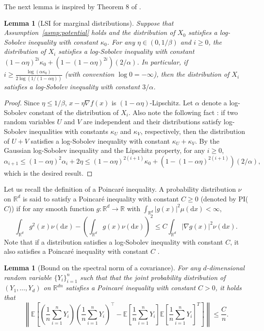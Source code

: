 \documentclass[12pt,reqno]{amsart}
\newtheorem{lemma}[theorem]{Lemma}
\theoremstyle{remark}
\theoremstyle{definition}
\newcommand{\R}{\mathbb{R}}
\newcommand{\E}{\mathbb{E}}
\newcommand{\diff}{\mathrm{d}}
\begin{document}
The next lemma is inspired by Theorem 8 of \citet[arXiv v4]{vempala2019rapid}.
\begin{lemma}[LSI for marginal distributions]\label{lem:vem19}
    Suppose that Assumption~\ref{asmp:potential} holds and the distribution of $X_{0}$ satisfies a log-Sobolev inequality with constant $\kappa_{0}$. For any $\eta\in(0,1/\beta)$ and $i\ge 0$, the distribution of $X_{i}$ satisfies a log-Sobolev inequality with constant $(1-\alpha\eta)^{2i}\kappa_{0}+(1-(1-\alpha\eta)^{2i})(2/\alpha)$.
    In particular, if $i\ge \frac{\log(\alpha\kappa_{0})}{2\log(1/(1-\alpha\eta))}$ (with convention $\log0=-\infty$), then the distribution of $X_{i}$ satisfies a log-Sobolev inequality with constant $3/\alpha$.
\end{lemma}

\begin{proof}
    Since $\eta\le 1/\beta$, $x-\eta\nabla f(x)$ is $(1-\alpha\eta)$-Lipschitz.
    Let $\alpha$ denote a log-Sobolev constant of the distribution of $X_{i}$.
    Also note the following fact \citep{bakry2014analysis}: if two random variables $U$ and $V$ are independent and their distributions satisfy log-Sobolev inequalities with constants $\kappa_{U}$ and $\kappa_{V}$, respectively, then the distribution of $U+V$ satisfies a log-Sobolev inequality with constant $\kappa_{U}+\kappa_{V}$.
    By the Gaussian log-Sobolev inequality and the Lipschitz property, for any $i\ge0$,
    \begin{equation*}
        \alpha_{i+1}\le (1-\alpha\eta)^{2}\alpha_{i}+2\eta\le (1-\alpha\eta)^{2(i+1)}\kappa_{0}+(1-(1-\alpha\eta)^{2(i+1)})(2/\alpha),
    \end{equation*}
    which is the desired result.
\end{proof}

Let us recall the definition of a Poincar\'{e} inequality. 
A probability distribution $\nu$ on $\R^{d}$ is said to satisfy a Poincar\'{e} inequality with constant $C\ge 0$ (denoted by PI($C$)) if for any smooth function $g:\R^{d}\to\R$ with $\int_{\R^{d}}|g(x)|^{2}\mu(\diff x)<\infty$,
\begin{equation*}
    \int_{\R^{d}}g^{2}(x)\nu(\diff x)-\left(\int_{\R^{d}}g(x)\nu(\diff x)\right)^{2}\le C\int_{\R^{d}}|\nabla g(x)|^{2}\nu(\diff x).
\end{equation*}
Note that if a distribution satisfies a log-Sobolev inequality with constant $C$, it also satisfies a Poincar\'{e} inequality with constant $C$ \citep{bakry2014analysis}.
\begin{lemma}[Bound on the spectral norm of a covariance]\label{lem:pi}
    For any $d$-dimensional random variable $\{Y_{i}\}_{i=1}^{n}$ such that that the joint probability distribution of $(Y_{1},\ldots,Y_{d})$ on $\R^{dn}$ satisfies a Poincar\'{e} inequality with constant $C>0$, it holds that
    \begin{equation*}
        \left\|\E\left[\left(\frac{1}{n}\sum_{i=1}^{n}Y_{i}\right)\left(\frac{1}{n}\sum_{i=1}^{n}Y_{i}\right)^{\top}-\E\left[\frac{1}{n}\sum_{i=1}^{n}Y_{i}\right]\E\left[\frac{1}{n}\sum_{i=1}^{n}Y_{i}\right]^{T}\right]\right\|\le \frac{C}{n}.
    \end{equation*}
\end{lemma}
\end{document}
